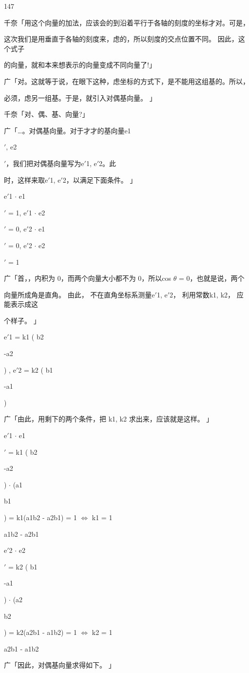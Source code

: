 147\par
千奈「用这个向量的加法，应该会的到沿着平行于各轴的刻度的坐标才对。可是，\par
这次我们是用垂直于各轴的刻度来，虑的，所以刻度的交点位置不同。 因此，这个式子\par
的向量，就和本来想表示的向量变成不同向量了!」\par
广「对。这就等于说，在眼下这种，虑坐标的方式下，是不能用这组基的。所以，\par
必须，虑另一组基。于是，就引入对偶基向量。 」\par
千奈「对、偶、基、向量?」\par
广「…。对偶基向量。对于才才的基向量e1\par
$\prime$, e2\par
$\prime$，我们把对偶基向量写为e$\prime$1, e$\prime$2。此\par
时，这样来取e$\prime$1, e$\prime$2，以满足下面条件。 」\par
e$\prime$1 $\cdot$ e1\par
$\prime$ = 1, e$\prime$1 $\cdot$ e2\par
$\prime$ = 0, e$\prime$2 $\cdot$ e1\par
$\prime$ = 0, e$\prime$2 $\cdot$ e2\par
$\prime$ = 1\par
广「首，，内积为 0，而两个向量大小都不为 0，所以cos $\theta$ = 0，也就是说，两个\par
向量所成角是直角。 由此， 不在直角坐标系测量e$\prime$1, e$\prime$2， 利用常数k1, k2， 应能表示成这\par
个样子。 」\par
e$\prime$1 = k1 ( b2\par
-a2\par
) , e$\prime$2 = k2 ( b1\par
-a1\par
)\par
广「由此，用剩下的两个条件，把 k1, k2 求出来，应该就是这样。 」\par
e$\prime$1 $\cdot$ e1\par
$\prime$ = k1 ( b2\par
-a2\par
) $\cdot$ (a1\par
b1\par
) = k1(a1b2 - a2b1) = 1 $\Leftrightarrow$ k1 = 1\par
a1b2 - a2b1\par
e$\prime$2 $\cdot$ e2\par
$\prime$ = k2 ( b1\par
-a1\par
) $\cdot$ (a2\par
b2\par
) = k2(a2b1 - a1b2) = 1 $\Leftrightarrow$ k2 = 1\par
a2b1 - a1b2\par
广「因此，对偶基向量求得如下。 」\par

